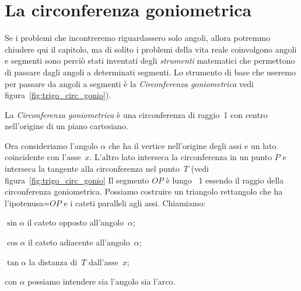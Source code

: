 \section{La circonferenza goniometrica}
\label{sec:gonio_circonferenza_goniometrica}

%     

Se i problemi che incontreremo riguardassero solo angoli, allora potremmo
chiudere qui il capitolo, ma di solito i problemi della vita reale coinvolgono
angoli e segmenti sono perciò stati inventati degli \emph{strumenti} matematici 
che permettono di passare dagli angoli a determinati segmenti. Lo strumento di 
base che useremo per passare da angoli a segmenti è la \emph{Circonferenza 
goniometrica} vedi figura~\ref{fig:trigo_circ_gonio}).

\begin{definizione}
 La \emph{Circonferenza goniometrica} è una circonferenza di raggio~1 con 
 centro nell'origine di un piano cartesiano.
\end{definizione}

Ora consideriamo l'angolo $\alpha$ che ha il vertice nell'origine degli assi e 
un lato coincidente con l'asse~$x$. L'altro lato interseca la circonferenza in 
un punto $P$ e interseca la tangente alla circonferenza nel punto~$T$
(vedi figura~\ref{fig:trigo_circ_gonio}
Il segmento $OP$ è lungo ~1 essendo il raggio della circonferenza goniometrica.
Possiamo costruire un triangolo rettangolo che ha l'ipotenusa=$OP$ e i cateti
paralleli agli assi. Chiamiamo:

\begin{itemize*}
 \item $\sin \alpha$ il cateto opposto all'angolo~$\alpha$;
 \item $\cos \alpha$ il cateto adiacente all'angolo~$\alpha$;
 \item $\tan \alpha$ la distanza di~$T$ dall'asse~$x$;
 \item con $\alpha$ possiamo intendere sia l'angolo sia l'arco.
\end{itemize*}


